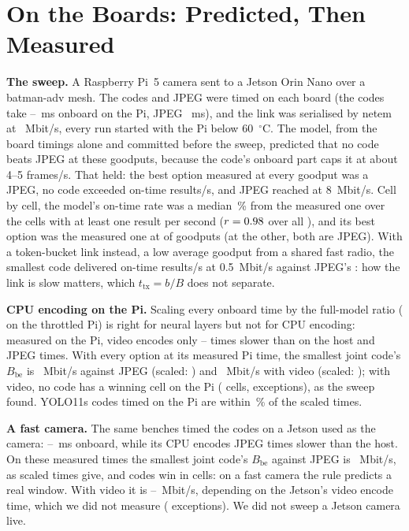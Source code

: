 \documentclass[conference,10pt]{IEEEtran}
\begin{document}
\section{On the Boards: Predicted, Then Measured}\label{sec:boards}
\textbf{The sweep.} A Raspberry Pi~5 camera sent to a Jetson Orin Nano over a batman-adv mesh. The codes and JPEG
were timed on each board (the codes take \BpCodeMsMin--\BpCodeMsMax~ms onboard on the Pi, JPEG \BpJpegOnb~ms), and the
link was serialised by netem at \BpRates~Mbit/s, every run started with the Pi below 60~$^\circ$C. The model,
from the board timings alone and committed before the sweep, predicted that no code beats JPEG at these goodputs,
because the code's onboard part caps it at about 4--5 frames/s. That held: the best option measured at every goodput
was a JPEG, no code exceeded \BpCodeFpsMax{} on-time results/s, and JPEG reached \BpJpegFpsEight{} at 8~Mbit/s. Cell
by cell, the model's on-time rate was a median \BpModelErrPct\,\% from the measured one over the \BpModelCellsBig{}
cells with at least one result per second ($r = 0.98$ over all \BpModelCells), and its best option was the
measured one at \BpModelBestMatch{} of \BpModelRates{} goodputs (at the other, both are JPEG). With a token-bucket link
instead, a low average goodput from a shared fast radio, the smallest code delivered \BpHtbCode{} on-time results/s at
0.5~Mbit/s against JPEG's \BpHtbJpeg: how the link is slow matters, which $t_{\mathrm{tx}} = b/B$ does not separate.

\textbf{CPU encoding on the Pi.} Scaling every onboard time by the full-model ratio (\BpScale{} on the throttled Pi)
is right for neural layers but not for CPU encoding: measured on the Pi, video encodes only \BpRatioMin--\BpRatioMax{}
times slower than on the host and JPEG \BpJpegRatio{} times. With every option at its measured Pi time, the smallest
joint code's $B_{\mathrm{be}}$ is \BpHeadJpegMeas~Mbit/s against JPEG (scaled: \BpHeadJpegRule) and
\BpHeadVideoMeas~Mbit/s with video (scaled: \BpHeadVideoRule); with video, no code has a winning cell on the Pi
(\BpWinsVideoMeas{} cells, \BpExc{} exceptions), as the sweep found. YOLO11s codes timed on the Pi are within
\BpYelevenDev\,\% of the scaled times.

\textbf{A fast camera.} The same benches timed the codes on a Jetson used as the camera: \BpJetCodeMsMin--\BpJetCodeMsMax~ms
onboard, while its CPU encodes JPEG \BpJetJpegRatio{} times slower than the host. On these measured times the smallest
joint code's $B_{\mathrm{be}}$ against JPEG is \BpJetHeadJpeg~Mbit/s, as scaled times give, and codes win in
\BpJetWinsJpeg{} cells: on a fast camera the rule predicts a real window. With video it is
\BpJetHeadVideoLo--\BpJetHeadVideoHi~Mbit/s, depending on the Jetson's video encode time, which we did not measure
(\BpJetExc{} exceptions). We did not sweep a Jetson camera live.
\end{document}
